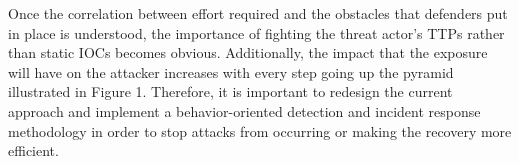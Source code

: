 Once the correlation between effort required and the obstacles that defenders put in place is understood, the importance of fighting the threat actor’s TTPs rather than static IOCs becomes obvious. Additionally, the impact that the exposure will have on the attacker increases with every step going up the pyramid illustrated in Figure 1. Therefore, it is important to redesign the current approach and implement a behavior-oriented detection and incident response methodology in order to stop attacks from occurring or making the recovery more efficient. 

